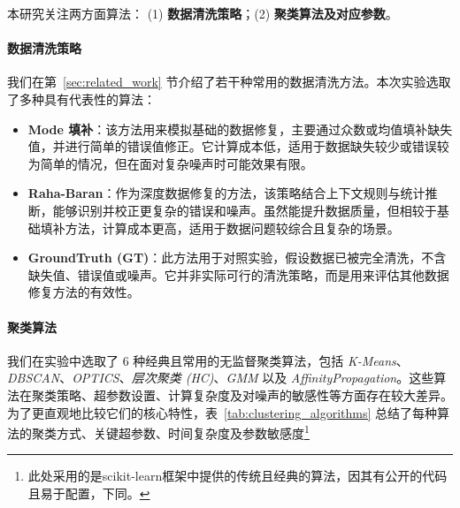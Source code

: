 \documentclass[10pt]{article} %
\numberwithin{equation}{section}
\begin{document}
本研究关注两方面算法：
(1) \textbf{数据清洗策略}；(2) \textbf{聚类算法及对应参数}。

\paragraph{数据清洗策略}
我们在第~\ref{sec:related_work} 节介绍了若干种常用的数据清洗方法。本次实验选取了多种具有代表性的算法：
\begin{itemize}
	\item \textbf{Mode 填补}：该方法用来模拟基础的数据修复，主要通过众数或均值填补缺失值，并进行简单的错误值修正。它计算成本低，适用于数据缺失较少或错误较为简单的情况，但在面对复杂噪声时可能效果有限。
	\item \textbf{Raha-Baran}：作为深度数据修复的方法，该策略结合上下文规则与统计推断，能够识别并校正更复杂的错误和噪声。虽然能提升数据质量，但相较于基础填补方法，计算成本更高，适用于数据问题较综合且复杂的场景。
	\item \textbf{GroundTruth (GT)}：此方法用于对照实验\cite{Abdelaal2023}，假设数据已被完全清洗，不含缺失值、错误值或噪声。它并非实际可行的清洗策略，而是用来评估其他数据修复方法的有效性。

\end{itemize}

\paragraph{聚类算法}
我们在实验中选取了 6 种经典且常用的无监督聚类算法，包括 \textit{K-Means}、\textit{DBSCAN}、\textit{OPTICS}、\textit{层次聚类 (HC)}、\textit{GMM} 以及 \textit{AffinityPropagation}。这些算法在聚类策略、超参数设置、计算复杂度及对噪声的敏感性等方面存在较大差异。为了更直观地比较它们的核心特性，表~\ref{tab:clustering_algorithms} 总结了每种算法的聚类方式、关键超参数、时间复杂度及参数敏感度\footnote{此处采用的是scikit-learn\cite{10.5555/1953048.2078195}框架中提供的传统且经典的算法，因其有公开的代码且易于配置，下同。}
\end{document}
